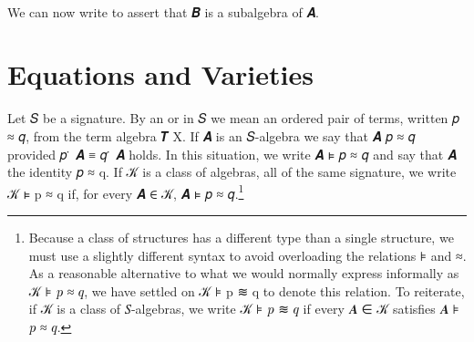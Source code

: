 \documentclass[a4paper,UKenglish,cleveref,autoref,thm-restate]{lipics-v2021}
\begin{document}
\ccpad
\begin{code}%
\>[0]\AgdaSpace{}%
\AgdaSymbol{:}\AgdaSpace{}%
\AgdaSymbol{\{}\AgdaSpace{}%
\AgdaSpace{}%
\AgdaSymbol{:}\AgdaSpace{}%
\AgdaSymbol{\}(}\AgdaSpace{}%
\AgdaSymbol{:}\AgdaSpace{}%
\AgdaSpace{}%
\AgdaSpace{}%
\AgdaSymbol{)(}\AgdaSpace{}%
\AgdaSymbol{:}\AgdaSpace{}%
\AgdaSpace{}%
\AgdaSpace{}%
\AgdaSymbol{)}\AgdaSpace{}%
\AgdaSpace{}%
\AgdaSpace{}%
\AgdaSpace{}%
\AgdaSpace{}%
\AgdaSpace{}%
\AgdaSpace{}%
\AgdaSpace{}%
\AgdaSpace{}%
\<%
\\
\>[0]\AgdaSpace{}%
\AgdaSpace{}%
\AgdaSpace{}%
\AgdaSymbol{=}\AgdaSpace{}%
\AgdaSpace{}%
\AgdaSpace{}%
\<%
\end{code}
\ccpad
We can now write    to assert that 𝑩 is a subalgebra of 𝑨.






\section{Equations and Varieties}\label{sec:equations-and-varieties}

Let \ab 𝑆 be a signature. By an  or  in \ab 𝑆 we mean an ordered pair of terms, written \ab 𝑝 \aof ≈ \ab 𝑞, from the term algebra \af 𝑻 \ab X. If \ab 𝑨 is an \ab 𝑆-algebra we say that \ab 𝑨  \ab 𝑝 \aof ≈ \ab 𝑞 provided \ab 𝑝 \af ̇ \ab 𝑨 \aod ≡ \ab 𝑞 \aof ̇ \ab 𝑨 holds. In this situation, we write \ab 𝑨 \aof ⊧ \ab 𝑝 \aof ≈ \ab 𝑞 and say that \ab 𝑨  the identity \ab 𝑝 \aof ≈ \ab q. If \ab 𝒦 is a class of algebras, all of the same signature, we write \ab 𝒦 \aof ⊧ \ab p \aof ≈ \ab q if, for every \ab 𝑨 \aof ∈ \ab 𝒦, \ab 𝑨 \aof ⊧ \ab 𝑝 \aof ≈ \ab 𝑞.\footnote{Because a class of structures has a different type than a single structure, we must use a slightly different syntax to avoid overloading the relations \af ⊧ and \af ≈. As a reasonable alternative to what we would normally express informally as 𝒦 \aof ⊧ \ab 𝑝 \aof ≈ \ab 𝑞, we have settled on \ab 𝒦 \aof ⊧ \ab p \aof ≋ \ab q to denote this relation.  To reiterate, if \ab 𝒦 is a class of \ab 𝑆-algebras, we write \ab 𝒦 \aof ⊧ \ab 𝑝 \aof ≋ \ab 𝑞 if every \ab 𝑨 \aof ∈ \ab 𝒦 satisfies \ab 𝑨 \aof ⊧ \ab 𝑝 \aof ≈ \ab 𝑞.}
\end{document}
